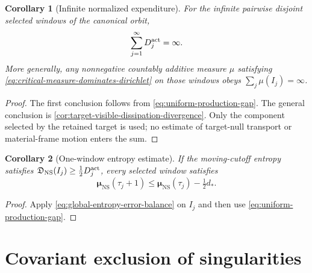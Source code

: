 \documentclass[11pt]{amsart}
\numberwithin{equation}{section}
\theoremstyle{plain}
\newtheorem{corollary}[corollary]{Corollary}
\theoremstyle{definition}
\theoremstyle{remark}
\newcommand{\EntropyNS}{\boldsymbol\mu_{\mathrm{NS}}}
\newcommand{\ProductionNS}{\mathfrak D_{\mathrm{NS}}}
\begin{document}
\begin{corollary}[Infinite normalized expenditure]
\label{cor:retained-target-production-divergence}
For the infinite pairwise disjoint selected windows of the canonical orbit,
\begin{equation}\label{eq:retained-target-production-divergence}
 \sum_{j=1}^{\infty}D_j^{\rm act}=\infty.
\end{equation}
More generally, any nonnegative countably additive measure \(\mu\) satisfying
\eqref{eq:critical-measure-dominates-dirichlet} on those windows obeys
\(\sum_j\mu(I_j)=\infty\).
\end{corollary}

\begin{proof}
The first conclusion follows from
\eqref{eq:uniform-production-gap}.  The general conclusion is
\cref{cor:target-visible-dissipation-divergence}.  Only the component selected
by the retained target is used; no estimate of target-null transport or
material-frame motion enters the sum.
\end{proof}

\begin{corollary}[One-window entropy estimate]
\label{cor:one-window-entropy-drop}
If the moving-cutoff entropy satisfies
\(\ProductionNS(I_j)\ge\tfrac12D_j^{\rm act}\), every selected window satisfies
\begin{equation}\label{eq:one-window-entropy-drop}
 \EntropyNS(\tau_j+1)
 \le \EntropyNS(\tau_j)-\tfrac12d_*.
\end{equation}
\end{corollary}

\begin{proof}
Apply \eqref{eq:global-entropy-error-balance} on \(I_j\) and then use
\eqref{eq:uniform-production-gap}.
\end{proof}

\section{Covariant exclusion of singularities}
\label{sec:global-exclusion}
\end{document}
